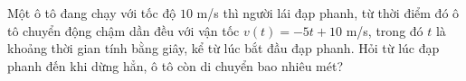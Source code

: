 \begin{ex}%
	Một ô tô đang chạy với tốc độ $10$ m/s thì người lái đạp phanh, từ thời điểm đó ô tô chuyển động chậm dần đều với vận tốc $v(t)=-5t+10$ m/s, trong đó $t$ là khoảng thời gian tính bằng giây, kể từ lúc bắt đầu đạp phanh. Hỏi từ lúc đạp phanh đến khi dừng hẳn, ô tô còn di chuyển bao nhiêu mét?
\end{ex}

